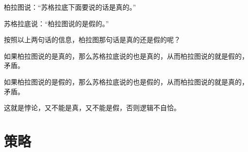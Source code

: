 \begin{example}\mbox{}\par
  柏拉图说：“苏格拉底下面要说的话是真的。”

  苏格拉底说：“柏拉图说的是假的。”
\end{example}

按照以上两句话的信息，柏拉图那句话是真的还是假的呢？

如果柏拉图说的是真的，那么苏格拉底说的也是真的，从而柏拉图说的就是假的，矛盾。

如果柏拉图说的是假的，那么苏格拉底说的也是假的，从而柏拉图说的就是真的，矛盾。

这就是悖论，又不能是真，又不能是假，否则逻辑不自恰。


\section{策略}
\label{sec:logic-strategy}

